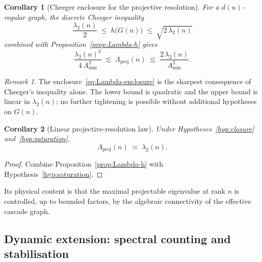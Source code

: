 \documentclass[12pt, a4paper]{article}
\theoremstyle{plain}
\newtheorem{corollary}{Corollary}[section]
\theoremstyle{definition}
\theoremstyle{remark}
\newtheorem{remark}{Remark}[section]
\begin{document}
      \begin{corollary}[Cheeger enclosure for the projective resolution]
        \label{cor:cheeger-enclosure}
        For a $d(n)$-regular graph, the discrete Cheeger inequality~\cite{Chung1997}
        \begin{equation}
          \label{eq:cheeger-ineq}
          \frac{\lambda_2(n)}{2} \;\leq\; h\bigl(G(n)\bigr) \;\leq\; \sqrt{2\,\lambda_2(n)}
        \end{equation}
        combined with Proposition~\ref{prop:Lambda-h} gives
        \begin{equation}
          \label{eq:Lambda-enclosure}
          \frac{\lambda_2(n)^2}{4\,A_{\min}^2}
          \;\lesssim\; \Lambda_{\mathrm{proj}}(n)
          \;\lesssim\; \frac{2\,\lambda_2(n)}{A_{\min}^2}.
        \end{equation}
      \end{corollary}

      \begin{remark}
        The enclosure~\eqref{eq:Lambda-enclosure} is the sharpest consequence of
        Cheeger's inequality alone.
        The lower bound is quadratic and the upper bound is linear in $\lambda_2(n)$;
        no further tightening is possible without additional hypotheses on $G(n)$.
      \end{remark}

      \begin{corollary}[Linear projective-resolution law]
        \label{cor:linear-law}
        Under Hypotheses~\ref{hyp:closure} and~\ref{hyp:saturation},
        \begin{equation}
          \label{eq:Lambda-linear}
          \Lambda_{\mathrm{proj}}(n) \;\asymp\; \lambda_2(n).
        \end{equation}
      \end{corollary}

      \begin{proof}
        Combine Proposition~\ref{prop:Lambda-h} with Hypothesis~\ref{hyp:saturation}.
      \end{proof}

      \noindent
      Its physical content is that the maximal projectable eigenvalue at rank $n$ is
      controlled, up to bounded factors, by the algebraic connectivity of the
      effective cascade graph.

    \subsection{Dynamic extension: spectral counting and stabilisation}
      \label{sec:framework:dynamic}
\end{document}
